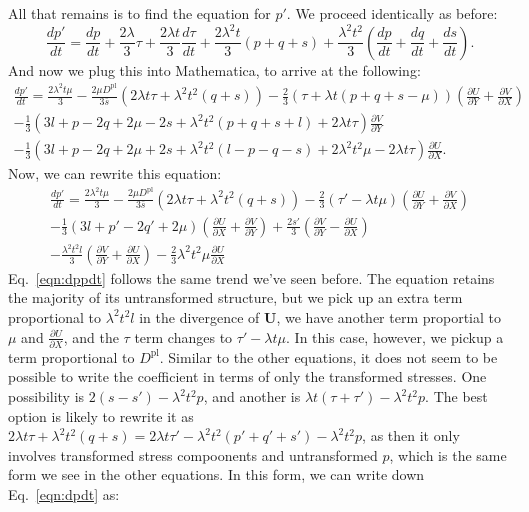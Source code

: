 \documentclass[11pt]{article}
\newcommand{\p}{\partial}
\newcommand{\bU}{\mathbf{U}}
\newcommand{\Dpl}{D^\text{pl}}
\begin{document}
All that remains is to find the equation for $p'$. We proceed identically as before:
\begin{equation}
    \frac{dp'}{dt} = \frac{dp}{dt} + \frac{2\lambda}{3}\tau + \frac{2\lambda t}{3}\frac{d\tau}{dt} + \frac{2\lambda^2t}{3}(p + q + s) + \frac{\lambda^2t^2}{3}\left(\frac{dp}{dt} + \frac{dq}{dt} + \frac{ds}{dt}\right).
\end{equation}
And now we plug this into Mathematica, to arrive at the following:
\begin{multline*}
    \frac{dp'}{dt} = \frac{2\lambda^2t\mu}{3} - \frac{2\mu\Dpl}{3\bar{s}}(2\lambda t\tau + \lambda^2t^2(q+s)) - \frac{2}{3}(\tau + \lambda t (p + q + s -\mu))\left(\frac{\p U}{\p Y} + \frac{\p V}{\p X}\right)\\
    -\frac{1}{3}(3l + p - 2q + 2\mu - 2s + \lambda^2t^2(p + q + s + l) + 2\lambda t\tau)\frac{\p V}{\p Y}\\
    -\frac{1}{3}(3l + p - 2q + 2\mu + 2s + \lambda^2t^2(l - p - q -s) + 2\lambda^2t^2\mu - 2\lambda t\tau)\frac{\p U}{\p X}.
\end{multline*}
Now, we can rewrite this equation:
\begin{multline}
    \frac{dp'}{dt} = \frac{2\lambda^2t\mu}{3} - \frac{2\mu\Dpl}{3\bar{s}}(2\lambda t\tau + \lambda^2t^2(q+s)) - \frac{2}{3}(\tau' - \lambda t\mu)\left(\frac{\p U}{\p Y} + \frac{\p V}{\p X}\right)\\
    - \frac{1}{3}(3l + p' - 2q' + 2\mu)\left(\frac{\p U}{\p X} + \frac{\p V}{\p Y}\right) + \frac{2s'}{3}\left(\frac{\p V}{\p Y} - \frac{\p U}{\p X}\right)\\
    - \frac{\lambda^2t^2l}{3}\left(\frac{\p V}{\p Y} + \frac{\p U}{\p X}\right) - \frac{2}{3}\lambda^2t^2\mu\frac{\p U}{\p X}
    \label{eqn:dppdt}
\end{multline}
Eq.~\ref{eqn:dppdt} follows the same trend we've seen before. The equation retains the majority of its untransformed structure, but we pick up an extra term proportional to $\lambda^2t^2l$ in the divergence of $\bU$, we have another term proportial to $\mu$ and $\frac{\p U}{\p X}$, and the $\tau$ term changes to $\tau' - \lambda t\mu$. In this case, however, we pickup a term proportional to $\Dpl$. Similar to the other equations, it does not seem to be possible to write the coefficient in terms of only the transformed stresses. One possibility is $2(s-s') - \lambda^2t^2p$, and another is $\lambda t(\tau + \tau') - \lambda^2 t^2p$. The best option is likely to rewrite it as $2\lambda t \tau + \lambda^2 t^2 (q + s) = 2 \lambda t \tau' - \lambda^2 t^2(p' + q' + s') - \lambda^2 t^2 p$, as then it only involves transformed stress compoonents and untransformed $p$, which is the same form we see in the other equations. In this form, we can write down Eq.~\ref{eqn:dpdt} as:
\end{document}
